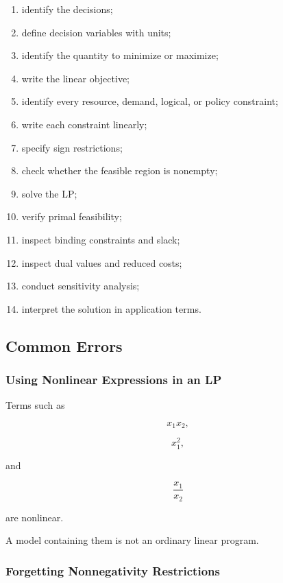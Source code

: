 \begin{enumerate}
    \item identify the decisions;
    \item define decision variables with units;
    \item identify the quantity to minimize or maximize;
    \item write the linear objective;
    \item identify every resource, demand, logical, or policy constraint;
    \item write each constraint linearly;
    \item specify sign restrictions;
    \item check whether the feasible region is nonempty;
    \item solve the LP;
    \item verify primal feasibility;
    \item inspect binding constraints and slack;
    \item inspect dual values and reduced costs;
    \item conduct sensitivity analysis;
    \item interpret the solution in application terms.
\end{enumerate}

\subsection{Common Errors}
\label{subsec:linear-programming-common-errors}

\subsubsection{Using Nonlinear Expressions in an LP}

Terms such as

\[
x_1x_2,
\]

\[
x_1^2,
\]

and

\[
\frac{x_1}{x_2}
\]

are nonlinear.

A model containing them is not an ordinary linear program.

\subsubsection{Forgetting Nonnegativity Restrictions}

